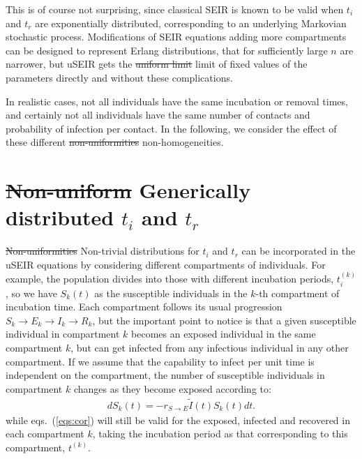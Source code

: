 \documentclass[10pt,letterpaper]{article}
\newcommand{\mychange}[2]{\textcolor[rgb]{0.75,0,0}{\st{#1} {#2}}}
\begin{document}
  This is of course not surprising, since classical SEIR is known to be valid when  $t_i$ and $t_r$
are exponentially distributed, corresponding to an underlying Markovian stochastic process. Modifications of SEIR equations adding more compartments can be designed to represent  Erlang distributions,  that for sufficiently large $n$  are narrower, but uSEIR gets the \mychange{uniform limit}{limit of fixed values of the parameters} directly and without these complications. 

In  realistic cases, not all individuals have the same incubation or removal times, and certainly not all individuals have the same number of contacts and probability of infection per contact. In the following, we consider the effect of these different \mychange{non-uniformities}{non-homogeneities}.

\section*{\mychange{Non-uniform}{Generically distributed} $t_i$ and $t_r$ }
\label{sec:titr}

\mychange{Non-uniformities}{Non-trivial distributions for $t_i$ and $t_r$} can be incorporated in the uSEIR equations by considering different compartments of individuals. For example, the population divides   into those with different incubation periods, $t_i^{(k)}$, so we have $S_k(t)$ as the susceptible individuals in the $k$-th compartment of incubation time. Each compartment follows its usual progression $S_k\rightarrow E_k \rightarrow I_k \rightarrow R_k$, but the important point to notice is that a given susceptible individual in compartment $k$ becomes an exposed individual in the same compartment $k$, but can get infected from any infectious individual in any other compartment. If we assume that the capability to infect per unit time is independent on the compartment, the number of susceptible individuals in compartment $k$ changes as they become exposed according to:
\begin{eqnarray}
d S_k(t) = - r_{S\rightarrow E} \tilde{I}(t) S_k(t) dt.
\end{eqnarray}
while eqs.~(\ref{eqs:cor}) will still be valid for the exposed, infected and recovered in each compartment $k$, taking the incubation period as that corresponding to this compartment, $t^{(k)}$.
\end{document}
